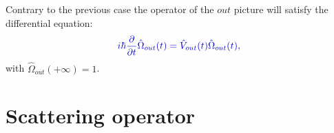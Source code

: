 \documentclass[12pt, titlepage]{article}
\begin{document}
Contrary to the previous case the operator of the $ out $ picture will satisfy the differential equation:
\begin{equation}\label{eq:time_evo_Omega_out}
\textcolor[RGB]{0,0,204}{
	i\hbar
	\frac{\partial}{\partial t}
	\hat{\Omega}_{out}(t)
	=
	\hat{V}_{out}(t)
	\hat{\Omega}_{out}(t)
	,
  }
\end{equation}
with $\hat{\Omega}_{out}(+\infty)=1$.
\section{Scattering operator}
\end{document}
